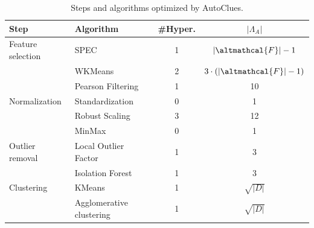 \begin{table}[t]
    \centering
    \begin{tabular}{llcc}
        \hline
        Step     & Algorithm & \#Hyper. & $|\Lambda_A|$\\\hline
        Feature selection & SPEC \cite{zhao2007spectral} & 1 & $|\altmathcal{F}|-1$\\
         & WKMeans \cite{WKMeans} & 2 & $3 \cdot (|\altmathcal{F}|-1)$\\
         & Pearson Filtering & 1 & 10\\
        Normalization     & Standardization & 0 & 1\\
        & Robust Scaling & 3 & 12\\
        & MinMax & 0 & 1\\
        Outlier removal   & Local Outlier Factor \cite{breunig2000lof} & 1 & 3\\
        & Isolation Forest \cite{liu2012isolation} & 1 & 3\\
        Clustering  & KMeans \cite{arthur2006k} & 1 & $\sqrt{|D|}$\\
        & Agglomerative clustering  \cite{murtagh2017algorithms} & 1 & $\sqrt{|D|}$\\\hline
    \end{tabular}
    \vspace{0.2cm}
    \caption{Steps and algorithms optimized by AutoClues.}
    \label{clustering-tbl:processing}
\end{table}


